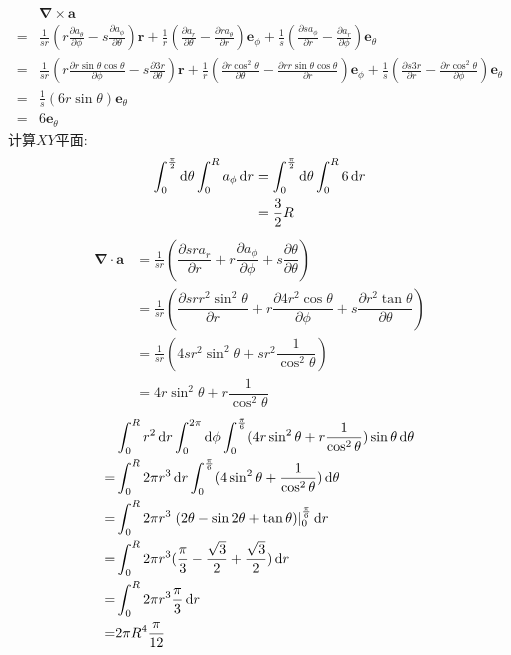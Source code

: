     \begin{align*}
    &\boldsymbol{\nabla}\times\boldsymbol a\\
    =&\frac{1}{sr}\left(r\frac{\partial a_\theta}{\partial \phi}-s\frac{\partial a_{\phi}}{\partial \theta}\right)\boldsymbol{r}
    +\frac{1}{r}\left(\frac{\partial a_r}{\partial \theta}
    -\frac{\partial ra_\theta}{\partial r}\right)\boldsymbol{e}_\phi
    +\frac{1}{s}\left(\frac{\partial sa_{\phi}}{\partial r}
    -\frac{\partial a_r}{\partial \phi}
    \right)\boldsymbol{e}_\theta\\
    =&\frac{1}{sr}\left(r\frac{\partial r\sin\theta\cos\theta}{\partial \phi}-s\frac{\partial 3r}{\partial \theta}\right)\boldsymbol{r}
    +\frac{1}{r}\left(\frac{\partial r\cos^2\theta}{\partial \theta}
    -\frac{\partial rr\sin\theta\cos\theta}{\partial r}\right)\boldsymbol{e}_\phi
    +\frac{1}{s}\left(\frac{\partial s3r}{\partial r}
    -\frac{\partial r\cos^2\theta}{\partial \phi}
    \right)\boldsymbol{e}_\theta\\
    =&\frac{1}{s}\left(6r\sin\theta
    \right)\boldsymbol{e}_\theta\\
    =&6\boldsymbol{e}_\theta
\end{align*}
计算$XY$平面:
\begin{align*}
    \int_{0}^{\frac{\pi}{2}}\dif \theta\int_{0}^{R}a_{\phi}\dif r
    &=\int_{0}^{\frac{\pi}{2}}\dif \theta\int_{0}^{R}6\dif r\\
    &=\frac{3}{2}R
\end{align*}
\begin{align*}
    \boldsymbol{\nabla}\cdot\boldsymbol a&=\frac{1}{sr}(\dfrac{\partial sra_r}{\partial r}+r\dfrac{\partial a_{\phi}}{\partial \phi}+s\dfrac{\partial \theta}{\partial \theta})\\
    &=\frac{1}{sr}(\dfrac{\partial srr^2\sin^2\theta}{\partial r}
    +r\dfrac{\partial 4r^2\cos\theta}{\partial \phi}
    +s\dfrac{\partial r^2\tan\theta}{\partial \theta})\\
    &=\frac{1}{sr}(4sr^2\sin^2\theta
    +sr^2\dfrac{1}{\cos^2\theta})\\
    &=4r\sin^2\theta
    +r\dfrac{1}{\cos^2\theta}
\end{align*}
\begin{align*}
    &\int_{0}^{R}r^2\dif r\int_{0}^{2\pi}\dif \phi\int_{0}^{\frac{\pi}{6}}(4r\sin^2\theta
    +r\dfrac{1}{\cos^2\theta})\sin\theta
    \dif \theta\\
    =&\int_{0}^{R}2\pi r^3\dif r\int_{0}^{\frac{\pi}{6}}(4\sin^2\theta
    +\dfrac{1}{\cos^2\theta})\dif \theta\\
    =&\int_{0}^{R}2\pi r^3\left.(2\theta-\sin2\theta+\tan\theta)\right|_{0}^{\frac{\pi}{6}}\dif r\\
    =&\int_{0}^{R}2\pi r^3(\frac{\pi}{3}-\frac{\sqrt{3}}{2}+\frac{\sqrt{3}}{2})\dif r\\
    =&\int_{0}^{R}2\pi r^3\frac{\pi}{3}\dif r\\
    =&2\pi R^4\frac{\pi}{12}
\end{align*}
